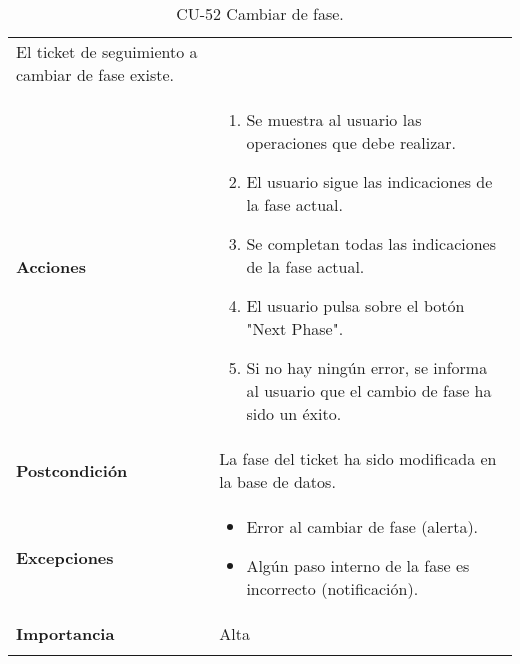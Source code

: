 \begin{longtable}[]{@{}ll@{}}
\begin{minipage}[t]{0.73\columnwidth}
El ticket de seguimiento a cambiar de fase existe.\strut
\end{minipage}\tabularnewline
\begin{minipage}[t]{0.21\columnwidth}\raggedright
\textbf{Acciones}\strut
\end{minipage} & \begin{minipage}[t]{0.73\columnwidth}\raggedright
\begin{enumerate}
\def\labelenumi{\arabic{enumi}.}
\tightlist
\item
  Se muestra al usuario las operaciones que debe realizar.
\item
  El usuario sigue las indicaciones de la fase actual.
\item
  Se completan todas las indicaciones de la fase actual.
\item
  El usuario pulsa sobre el botón "Next Phase".
\item
  Si no hay ningún error, se informa al usuario que el cambio de fase ha
  sido un éxito.
\end{enumerate}\strut
\end{minipage}\tabularnewline
\begin{minipage}[t]{0.21\columnwidth}\raggedright
\textbf{Postcondición}\strut
\end{minipage} & \begin{minipage}[t]{0.73\columnwidth}\raggedright
La fase del ticket ha sido modificada en la base de datos.\strut
\end{minipage}\tabularnewline
\begin{minipage}[t]{0.21\columnwidth}\raggedright
\textbf{Excepciones}\strut
\end{minipage} & \begin{minipage}[t]{0.73\columnwidth}\raggedright
\begin{itemize}
\tightlist
\item
  Error al cambiar de fase (alerta).
\item
  Algún paso interno de la fase es incorrecto (notificación).
\end{itemize}\strut
\end{minipage}\tabularnewline
\begin{minipage}[t]{0.21\columnwidth}\raggedright
\textbf{Importancia}\strut
\end{minipage} & \begin{minipage}[t]{0.73\columnwidth}\raggedright
Alta\strut
\end{minipage}\tabularnewline
\bottomrule
\caption{CU-52 Cambiar de fase.}
\end{longtable}

